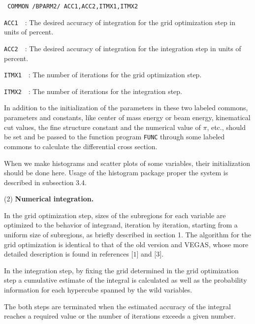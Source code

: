 {\small \begin{verbatim}
 COMMON /BPARM2/ ACC1,ACC2,ITMX1,ITMX2
\end{verbatim}}
\par
{\small
\begin{description}
\item{\tt ACC1}~~:  The desired accuracy of integration for the grid
optimization step in units of percent.
\item{\tt ACC2}~~:  The desired accuracy of integration for the integration
step in units of percent.
\item{\tt ITMX1}~~:  The number of iterations for the grid optimization
step.
\item{\tt ITMX2}~~:  The number of iterations for the integration step.
\end{description}}
\par\noindent
In addition to the initialization of the parameters in these two labeled commons,
parameters and constants, like center of mass energy or beam energy, 
kinematical cut values, the fine structure constant and
the numerical value of $\pi$, etc., should be set and be passed to the function
program {\tt FUNC} through some labeled commons to calculate the differential cross
section.
\par
When we make histograms and scatter plots of some variables, their
initialization should be done here. 
Usage of the histogram package proper the system is described in subsection 3.4. 
\par\medskip
\noindent
(2) {\bf Numerical integration.}
\par\smallskip
In the grid optimization step, sizes of the subregions for each variable are
optimized to the behavior of integrand, iteration by iteration, starting from a
uniform size of subregions, as briefly described in section 1. The algorithm for the
grid  optimization is identical to that of the
old version and VEGAS, whose more detailed description is
found in references $\lbrack 1 \rbrack$ and $\lbrack 3 \rbrack$.  
\par\noindent
In the integration step, by fixing the grid determined in the grid
optimization step a cumulative estimate of the integral is calculated as well as the
probability information for each hypercube spanned by the wild variables.
\par\noindent
 The both steps are terminated when the estimated accuracy of the integral reaches a
required value or the number of iterations exceeds a given number. 
\par
